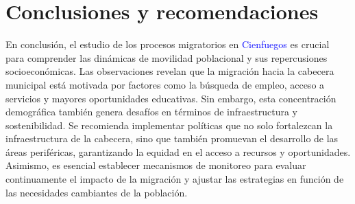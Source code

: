\documentclass{article}
\begin{document}
\section{Conclusiones y recomendaciones}
En conclusión, el estudio de los procesos migratorios en \textcolor{blue}{Cienfuegos} es crucial para comprender las dinámicas de movilidad poblacional y sus repercusiones socioeconómicas. Las observaciones revelan que la migración hacia la cabecera municipal está motivada por factores como la búsqueda de empleo, acceso a servicios y mayores oportunidades educativas. Sin embargo, esta concentración demográfica también genera desafíos en términos de infraestructura y sostenibilidad. Se recomienda implementar políticas que no solo fortalezcan la infraestructura de la cabecera, sino que también promuevan el desarrollo de las áreas periféricas, garantizando la equidad en el acceso a recursos y oportunidades. Asimismo, es esencial establecer mecanismos de monitoreo para evaluar continuamente el impacto de la migración y ajustar las estrategias en función de las necesidades cambiantes de la población.
\end{document}
